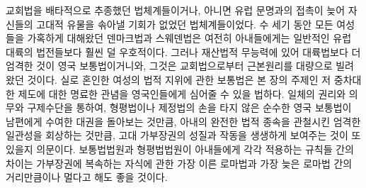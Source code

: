 교회법을 배타적으로 추종했던 법체계들이거나,
아니면
유럽 문명과의 접촉이 늦어 자신들의 고대적 유물을 솎아낼 기회가 없었던
법체계들이었다.
수 세기 동안 모든 여성들을 가혹하게 대해왔던 덴마크법과 스웨덴법은
여전히 아내들에게는
일반적인 유럽 대륙의 법전들보다
훨씬 덜 우호적이다.
그러나 재산법적 무능력에 있어 대륙법보다 더 엄격한 것이
영국 보통법이거니와,
그것은 교회법으로부터 근본원리를 대량으로 빌려왔던 것이다.
실로 혼인한 여성의 법적 지위에 관한 보통법은
본 장의 주제인 저 중차대한 제도에 대한 명료한 관념을
영국인들에게 심어줄 수 있을 법하다.
일체의 권리와 의무와 구제수단을 통하여,
형평법이나 제정법의 손을 타지 않은
순수한 영국 보통법이
남편에게 수여한 대권을 돌아보는 것만큼,
아내의 완전한 법적 종속을 관철시킨 엄격한 일관성을 회상하는 것만큼,
고대 가부장권의 성질과 작동을 생생하게 보여주는 것이 또 있을지 의문이다.
보통법법원과 형평법법원이 아내들에게 각각 적용하는 규칙들 간의 차이는
가부장권에 복속하는 자식에 관한 가장 이른 로마법과 가장 늦은 로마법 간의
거리만큼이나 멀다고 해도 좋을 것이다.


